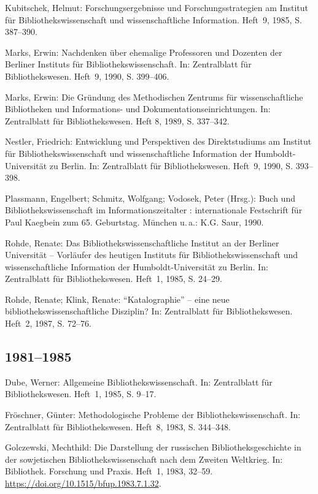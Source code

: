 \documentclass[a4paper,
fontsize=11pt,
oneside,
numbers=noperiodatend,
parskip=half-,
bibliography=totoc,
final
]{scrartcl}
\begin{document}
Kubitschek, Helmut: Forschungsergebnisse und Forschungsstrategien am
Institut für Bibliothekswissenschaft und wissenschaftliche Information.
Heft~9, 1985, S. 387--390.

Marks, Erwin: Nachdenken über ehemalige Professoren und Dozenten der
Berliner Instituts für Bibliothekswissenschaft. In: Zentralblatt für
Bibliothekswesen. Heft~9, 1990, S. 399--406.

Marks, Erwin: Die Gründung des Methodischen Zentrums für
wissenschaftliche Bibliotheken und Informations- und
Dokumentationseinrichtungen. In: Zentralblatt für Bibliothekswesen. Heft
8, 1989, S. 337--342.

Nestler, Friedrich: Entwicklung und Perspektiven des Direktstudiums am
Institut für Bibliothekswissenschaft und wissenschaftliche Information
der Humboldt-Universität zu Berlin. In: Zentralblatt für
Bibliothekswesen. Heft~9, 1990, S. 393--398.

Plassmann, Engelbert; Schmitz, Wolfgang; Vodosek, Peter (Hrsg.): Buch
und Bibliothekswissenschaft im Informationszeitalter : internationale
Festschrift für Paul Kaegbein zum 65. Geburtstag. München u.\,a.: K.G.
Saur, 1990.

Rohde, Renate: Das Bibliothekswissenschaftliche Institut an der Berliner
Universität -- Vorläufer des heutigen Instituts für
Bibliothekswissenschaft und wissenschaftliche Information der
Humboldt-Universität zu Berlin. In: Zentralblatt für Bibliothekswesen.
Heft~1, 1985, S. 24--29.

Rohde, Renate; Klink, Renate: \enquote{Katalographie} -- eine neue
bibliothekswissenschaftliche Disziplin? In: Zentralblatt für
Bibliothekswesen. Heft~2, 1987, S. 72--76.

\hypertarget{section-3}{%
\subsection*{1981--1985}\label{section-3}}

Dube, Werner: Allgemeine Bibliothekswissenschaft. In: Zentralblatt für
Bibliothekswesen. Heft~1, 1985, S. 9--17.

Fröschner, Günter: Methodologische Probleme der Bibliothekswissenschaft.
In: Zentralblatt für Bibliothekswesen. Heft~8, 1983, S. 344--348.

Golczewski, Mechthild: Die Darstellung der russischen
Bibliotheksgeschichte in der sowjetischen Bibliothekswissenschaft nach
dem Zweiten Weltkrieg. In: Bibliothek. Forschung und Praxis. Heft~1,
1983, 32--59. \url{https://doi.org/10.1515/bfup.1983.7.1.32}.
\end{document}
